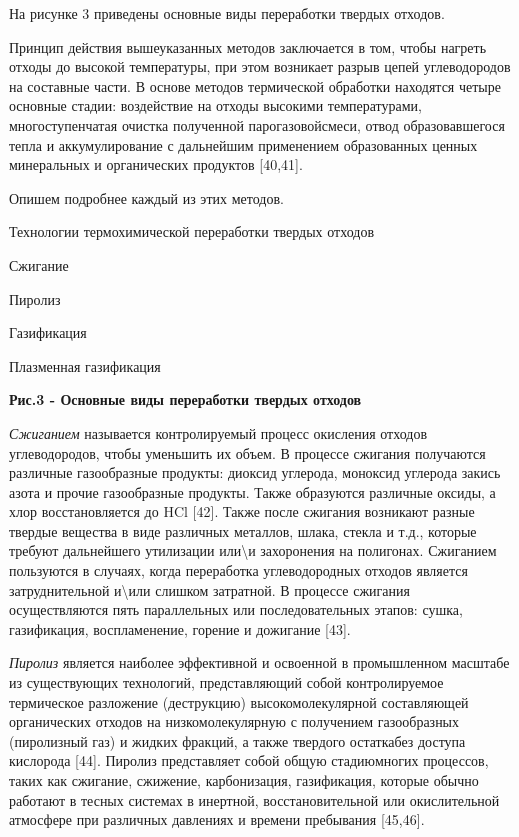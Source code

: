 На рисунке 3 приведены основные виды переработки твердых отходов.

Принцип действия вышеуказанных методов заключается в том, чтобы нагреть
отходы до высокой тем­пературы, при этом возникает разрыв цепей
углеводо­родов на составные части. В основе методов термической обработки
находятся четыре основные стадии: воздей­ствие на отходы высокими
температура­ми, многоступенчатая очистка полученной парогазовойсмеси,
отвод образовавшегося тепла и аккумулирование с дальнейшим применением
образованных ценных мине­ральных и органических продуктов {[}40,41{]}.

Опишем подробнее каждый из этих методов.

Технологии термохимической переработки твердых отходов

Сжигание

Пиролиз

Газификация

Плазменная газификация

{\bfseries Рис.3 - Основные виды переработки твердых отходов}

\emph{Сжиганием} называется контролируемый процесс окисления отходов
углеводородов, чтобы уменьшить их объем. В процессе сжигания получаются
различные газо­образные продукты: диоксид углерода, моноксид углеро­да
закись азота и прочие газообразные продукты. Также образуются различные
оксиды, а хлор восстановляется до HCl {[}42{]}. Также после сжигания
возникают разные твердые вещества в виде различных металлов, шлака,
стекла и т.д., которые требуют дальнейшего утилизации
или\textbackslash и захо­ронения на полигонах. Сжиганием пользуются в
случаях, когда переработка углеводородных отходов является
затруднительной и\textbackslash или слишком затратной. В процессе
сжигания осуществляются пять парал­лельных или последовательных этапов:
сушка, газифи­кация, воспламенение, горение и дожигание {[}43{]}.

\emph{Пиролиз} является наиболее эффективной и освоенной в промышленном
масштабе из существующих технологий, представляющий собой контролируемое
термическое разло­жение (деструкцию) высокомолекулярной составляющей
органических отходов на низкомолекулярную с получе­нием газообразных
(пиролизный газ) и жидких фракций, а также твердого остаткабез доступа
кислорода {[}44{]}. Пиролиз представляет собой общую стадиюмногих
процессов, таких как сжигание, сжижение, карбонизация, газификация,
которые обычно работают в тесных системах в инертной, восстановительной
или окислительной атмосфере при различных давлениях и времени пребывания
{[}45,46{]}.

